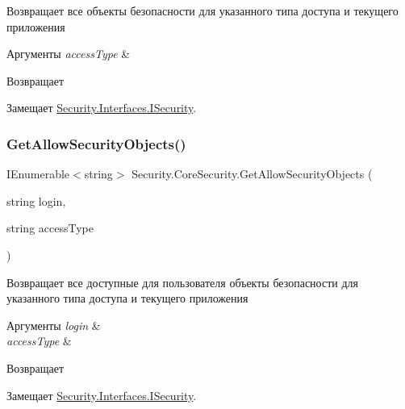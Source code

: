 Возвращает все объекты безопасности для указанного типа доступа и текущего приложения 


\begin{DoxyParams}{Аргументы}
{\em access\+Type} & \\
\hline
\end{DoxyParams}
\begin{DoxyReturn}{Возвращает}

\end{DoxyReturn}


Замещает \hyperlink{interface_security_1_1_interfaces_1_1_i_security_aa7e5e1c0fdd2fe0e3a763750decbcffb}{Security.\+Interfaces.\+I\+Security}.

\mbox{\label{class_security_1_1_core_security_ad9dd82159ce61eba5ab68fed5167ec87}} 
\subsubsection{\texorpdfstring{Get\+Allow\+Security\+Objects()}{GetAllowSecurityObjects()}}
{\footnotesize\ttfamily I\+Enumerable$<$string$>$ Security.\+Core\+Security.\+Get\+Allow\+Security\+Objects (\begin{DoxyParamCaption}\item[{string}]{login,  }\item[{string}]{access\+Type }\end{DoxyParamCaption})}



Возвращает все доступные для пользователя объекты безопасности для указанного типа доступа и текущего приложения 


\begin{DoxyParams}{Аргументы}
{\em login} & \\
\hline
{\em access\+Type} & \\
\hline
\end{DoxyParams}
\begin{DoxyReturn}{Возвращает}

\end{DoxyReturn}


Замещает \hyperlink{interface_security_1_1_interfaces_1_1_i_security_aef63980964e18a05521826c46040c068}{Security.\+Interfaces.\+I\+Security}.

